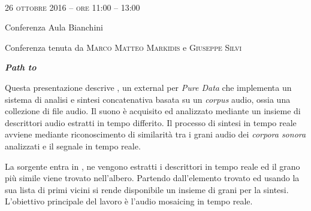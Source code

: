 
\begin{flushleft}

~\vfill

\large{
	\scshape{
	26 ottobre 2016 -- ore 11:00 -- 13:00
	}}

\medskip
	
\small{Conferenza
	\newline Aula Bianchini}

\medskip

{\fontsize{42}{42} }

\normalfont

\normalsize

\bigskip

Conferenza tenuta da \textsc{Marco Matteo Markidis} e \textsc{Giuseppe Silvi}

\bigskip

\textbf{\emph{Path to \pa}}

Questa presentazione descrive \pa , %
un external per \emph{Pure Data} che implementa un sistema di analisi e sintesi concatenativa basata su un \emph{corpus} audio, ossia una collezione di file audio. %
Il suono \`e acquisito %
ed analizzato mediante un insieme di descrittori audio estratti in tempo differito. Il processo di sintesi in tempo reale avviene mediante riconoscimento di similarit\`a tra i grani audio dei \emph{corpora sonora} analizzati e il segnale in tempo reale.


La sorgente entra in \pa , ne vengono estratti i descrittori in tempo reale ed il grano pi\`u simile viene trovato nell'albero. Partendo dall'elemento trovato ed usando la sua lista di primi vicini si rende disponibile un insieme di grani per la sintesi. L'obiettivo principale del lavoro \`e l'audio mosaicing in tempo reale. 


\end{flushleft}
